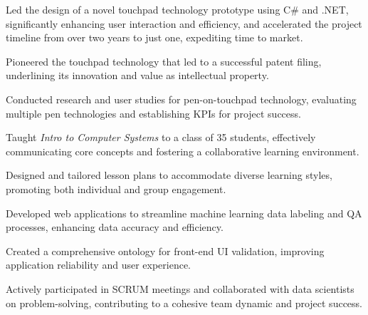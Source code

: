 \documentclass[10pt]{resume-openfont}
\begin{document}
\begin{minipage}[t]{1\textwidth}
\begin{tightemize}
\item Led the design of a novel touchpad technology prototype using C\# and .NET, significantly enhancing user interaction and efficiency, and accelerated the project timeline from over two years to just one, expediting time to market.
\item Pioneered the touchpad technology that led to a successful patent filing, underlining its innovation and value as intellectual property.
\item Conducted research and user studies for pen-on-touchpad technology, evaluating multiple pen technologies and establishing KPIs for project success.
\end{tightemize}
\sectionsep

\begin{tightemize}
\item Taught {\it Intro to Computer Systems} to a class of 35 students, effectively communicating core concepts and fostering a collaborative learning environment.
\item Designed and tailored lesson plans to accommodate diverse learning styles, promoting both individual and group engagement.
\end{tightemize}
\sectionsep

\begin{tightemize}
\item Developed web applications to streamline machine learning data labeling and QA processes, enhancing data accuracy and efficiency.
\item Created a comprehensive ontology for front-end UI validation, improving application reliability and user experience.
\item Actively participated in SCRUM meetings and collaborated with data scientists on problem-solving, contributing to a cohesive team dynamic and project success.
\end{tightemize}
\sectionsep

\end{minipage}
\end{document}
